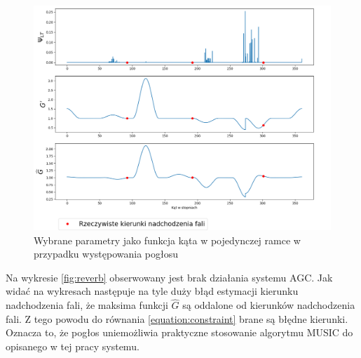 \begin{figure}[h!]
    \centering
    \includegraphics[width=\textwidth]{Images/reverb_params_in_angle.png}
    \caption{Wybrane parametry jako funkcja kąta w pojedynczej ramce w przypadku występowania pogłosu}
    \label{fig:reverb_params_in_angle}
\end{figure}

\noindent Na wykresie \ref{fig:reverb} obserwowany jest brak działania systemu AGC. Jak widać na wykresach następuje na tyle duży błąd estymacji kierunku nadchodzenia fali, że maksima funkcji $\widehat{G}$ są oddalone od kierunków nadchodzenia fali. Z tego powodu do równania \eqref{equation:constraint} brane są błędne kierunki. Oznacza to, że pogłos uniemożliwia praktyczne stosowanie algorytmu MUSIC do opisanego w tej pracy systemu.













